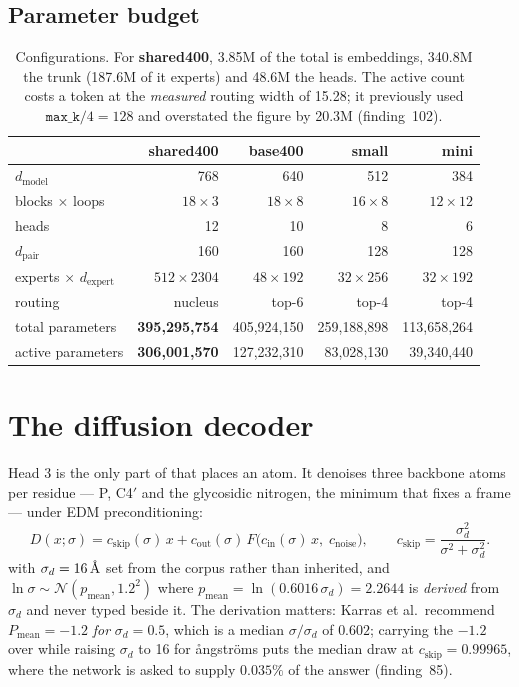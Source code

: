 \documentclass[11pt,a4paper]{article}
\begin{document}
\subsection{Parameter budget}

\begin{table}[H]\centering\small
\begin{tabular}{lrrrr}
\toprule
& \textbf{shared400} & base400 & small & mini \\
\midrule
$d_{\text{model}}$        & 768 & 640 & 512 & 384 \\
blocks $\times$ loops     & $18\times3$ & $18\times8$ & $16\times8$ & $12\times12$ \\
heads                     & 12 & 10 & 8 & 6 \\
$d_{\text{pair}}$         & 160 & 160 & 128 & 128 \\
experts $\times$ $d_{\text{expert}}$ & $512\times2304$ & $48\times192$ & $32\times256$ & $32\times192$ \\
routing                   & nucleus & top-6 & top-4 & top-4 \\
\midrule
total parameters          & \textbf{395{,}295{,}754} & 405{,}924{,}150 & 259{,}188{,}898 & 113{,}658{,}264 \\
active parameters         & \textbf{306{,}001{,}570} & 127{,}232{,}310 & 83{,}028{,}130 & 39{,}340{,}440 \\
\bottomrule
\end{tabular}
\caption{Configurations. For \textbf{shared400}, 3.85M of the total is
embeddings, 340.8M the trunk (187.6M of it experts) and 48.6M the heads.
The active count costs a token at the \emph{measured} routing width of
15.28; it previously used $\texttt{max\_k}/4 = 128$ and overstated the
figure by 20.3M (finding~102).}
\end{table}

\section{The diffusion decoder}
\label{sec:decoder}

Head 3 is the only part of \pharos{} that places an atom. It denoises
three backbone atoms per residue --- P, C4$'$ and the glycosidic
nitrogen, the minimum that fixes a frame --- under EDM preconditioning:
\begin{equation}
D(x;\sigma) = c_{\text{skip}}(\sigma)\,x
            + c_{\text{out}}(\sigma)\,F\!\big(c_{\text{in}}(\sigma)\,x,\;c_{\text{noise}}\big),
\qquad
c_{\text{skip}} = \frac{\sigma_d^2}{\sigma^2+\sigma_d^2}.
\end{equation}
with $\sigma_d = 16\,\text{\AA}$ set from the corpus rather than inherited, and
$\ln\sigma \sim \mathcal{N}(p_{\text{mean}}, 1.2^2)$ where
$p_{\text{mean}} = \ln(0.6016\,\sigma_d) = 2.2644$ is \emph{derived} from
$\sigma_d$ and never typed beside it. The derivation matters: Karras
et al.\ recommend $P_{\text{mean}} = -1.2$ \emph{for} $\sigma_d = 0.5$,
which is a median $\sigma/\sigma_d$ of $0.602$; carrying the $-1.2$ over
while raising $\sigma_d$ to 16 for \aa ngstr\"oms puts the median draw at
$c_{\text{skip}} = 0.99965$, where the network is asked to supply
$0.035\%$ of the answer (finding~85).
\end{document}
